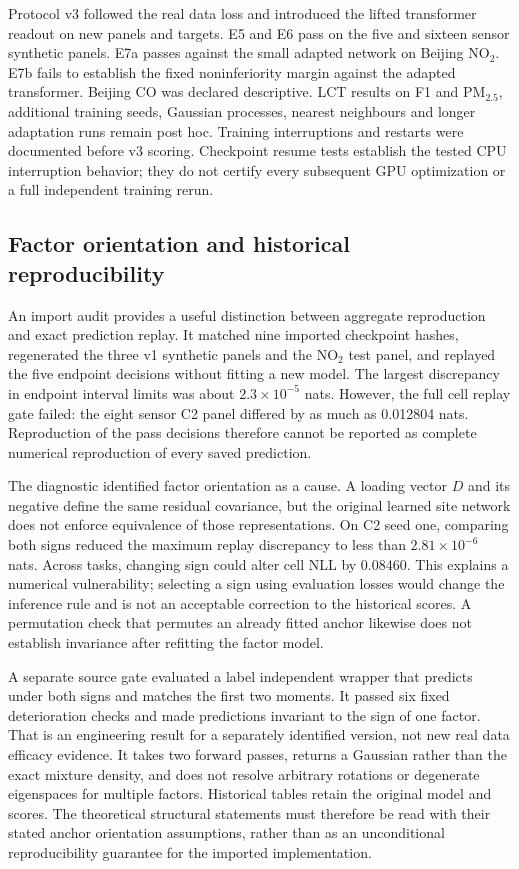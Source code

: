 Protocol v3 followed the real data loss and introduced the lifted transformer readout on new panels and targets. E5 and E6 pass on the five and sixteen sensor synthetic panels. E7a passes against the small adapted network on Beijing NO$_2$. E7b fails to establish the fixed noninferiority margin against the adapted transformer. Beijing CO was declared descriptive. LCT results on F1 and PM$_{2.5}$, additional training seeds, Gaussian processes, nearest neighbours and longer adaptation runs remain post hoc. Training interruptions and restarts were documented before v3 scoring. Checkpoint resume tests establish the tested CPU interruption behavior; they do not certify every subsequent GPU optimization or a full independent training rerun.

\subsection{Factor orientation and historical reproducibility}
\label{sec:provenance}

An import audit provides a useful distinction between aggregate reproduction and exact prediction replay. It matched nine imported checkpoint hashes, regenerated the three v1 synthetic panels and the NO$_2$ test panel, and replayed the five endpoint decisions without fitting a new model. The largest discrepancy in endpoint interval limits was about $2.3\times10^{-5}$ nats. However, the full cell replay gate failed: the eight sensor C2 panel differed by as much as 0.012804 nats. Reproduction of the pass decisions therefore cannot be reported as complete numerical reproduction of every saved prediction.

The diagnostic identified factor orientation as a cause. A loading vector $D$ and its negative define the same residual covariance, but the original learned site network does not enforce equivalence of those representations. On C2 seed one, comparing both signs reduced the maximum replay discrepancy to less than $2.81\times10^{-6}$ nats. Across tasks, changing sign could alter cell NLL by 0.08460. This explains a numerical vulnerability; selecting a sign using evaluation losses would change the inference rule and is not an acceptable correction to the historical scores. A permutation check that permutes an already fitted anchor likewise does not establish invariance after refitting the factor model.

A separate source gate evaluated a label independent wrapper that predicts under both signs and matches the first two moments. It passed six fixed deterioration checks and made predictions invariant to the sign of one factor. That is an engineering result for a separately identified version, not new real data efficacy evidence. It takes two forward passes, returns a Gaussian rather than the exact mixture density, and does not resolve arbitrary rotations or degenerate eigenspaces for multiple factors. Historical tables retain the original model and scores. The theoretical structural statements must therefore be read with their stated anchor orientation assumptions, rather than as an unconditional reproducibility guarantee for the imported implementation.

